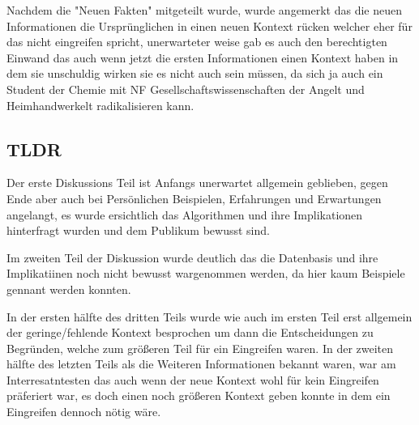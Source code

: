 \documentclass[12pt,a4paper]{article}
\begin{document}
	Nachdem die "Neuen Fakten" mitgeteilt wurde, wurde angemerkt das die neuen Informationen die Ursprünglichen in einen neuen Kontext rücken welcher eher für das nicht eingreifen spricht, unerwarteter weise gab es auch den berechtigten Einwand das auch wenn jetzt die ersten Informationen einen Kontext haben in dem sie unschuldig wirken sie es nicht auch sein müssen, da sich ja  auch ein Student der Chemie mit NF Gesellschaftswissenschaften der Angelt und Heimhandwerkelt radikalisieren kann.
	
\subsection*{TLDR}

	Der erste Diskussions Teil ist Anfangs unerwartet allgemein geblieben, gegen Ende aber auch bei Persönlichen Beispielen, Erfahrungen und Erwartungen angelangt, es wurde ersichtlich das Algorithmen und ihre Implikationen hinterfragt wurden und dem Publikum bewusst sind.
	
	Im zweiten Teil der Diskussion wurde deutlich das die Datenbasis und ihre Implikatiinen noch nicht bewusst wargenommen werden, da hier kaum Beispiele gennant werden konnten.
	
	In der ersten hälfte des dritten Teils wurde wie auch im ersten Teil erst allgemein der geringe/fehlende Kontext besprochen um dann die Entscheidungen zu Begründen, welche zum größeren Teil für ein Eingreifen waren.
	In der zweiten hälfte des letzten Teils als die Weiteren Informationen bekannt waren, war am Interresatntesten das auch wenn der neue Kontext wohl für kein Eingreifen präferiert war, es doch einen noch größeren Kontext geben konnte in dem ein Eingreifen dennoch nötig wäre.
	
\end{document}
